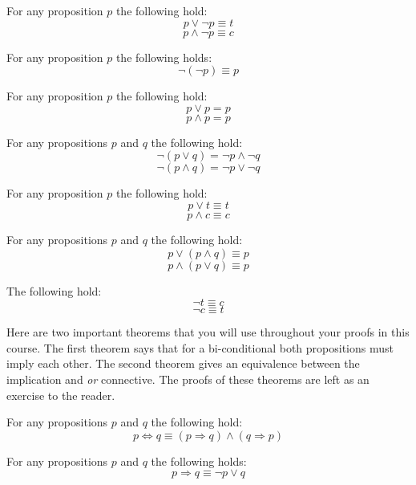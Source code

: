 \documentclass[main.tex]{subfiles}
\begin{document}
\begin{thm}[Negation]
	For any proposition \(p\) the following hold: \[p \lor \lnot p \equiv t\] \[p \land \lnot p \equiv c\]
\end{thm}

\begin{thm}
	For any proposition \(p\) the following holds: \[\lnot (\lnot p) \equiv p\]
\end{thm}

\begin{thm}[Idempotence]
	For any proposition \(p\) the following hold: \[p \lor p = p\] \[p \land p = p\]
\end{thm}

\begin{thm}[De Morgan's]
	For any propositions \(p\) and \(q\) the following hold: \[\lnot (p \lor q) = \lnot p \land \lnot q\] \[\lnot (p \land q) = \lnot p \lor \lnot q\]
\end{thm}

\begin{thm}
	For any proposition \(p\) the following hold: \[p \lor t \equiv t\] \[p \land c \equiv c\]
\end{thm}

\begin{thm}[Absorption]
	For any propositions \(p\) and \(q\) the following hold: \[p \lor (p \land q) \equiv p\] \[p \land (p \lor q) \equiv p\]
\end{thm}

\begin{thm}
	The following hold: \[\lnot t \equiv c\] \[\lnot c \equiv t\]
\end{thm}

Here are two important theorems that you will use throughout your proofs in this course. The first theorem says that for a bi-conditional both propositions must imply each other. The second theorem gives an equivalence between the implication and \textit{or} connective. The proofs of these theorems are left as an exercise to the reader.

\begin{thm}
	\label{bicond-to-imp}
	For any propositions \(p\) and \(q\) the following hold: \[p \Leftrightarrow q \equiv (p \Rightarrow q) \land (q \Rightarrow p)\]
\end{thm}

\begin{thm}
	\label{imp-to-disj}
	For any propositions \(p\) and \(q\) the following holds: \[p \Rightarrow q \equiv \lnot p \lor q\]
\end{thm}
\end{document}
